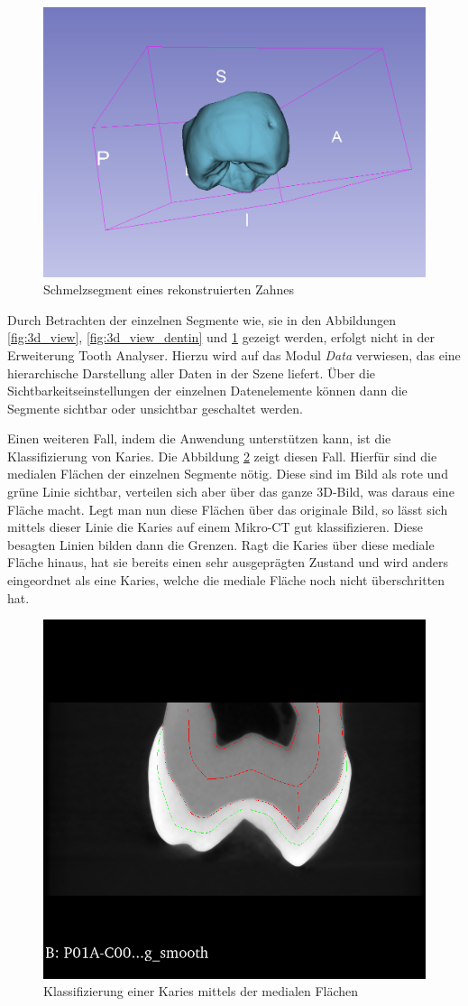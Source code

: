 \begin{figure}[h]
\begin{minipage}[b]{0.32\textwidth}
		\includegraphics[width=\textwidth]{img/3dViewEnamel.png}
		\caption{Schmelzsegment eines rekonstruierten Zahnes}
		\label{fig:3d_view_schmelz}
	\end{minipage}
\end{figure}

Durch Betrachten der einzelnen Segmente wie, sie in den Abbildungen
\ref{fig:3d_view}, \ref{fig:3d_view_dentin} und \ref{fig:3d_view_schmelz} gezeigt
werden, erfolgt nicht in der Erweiterung Tooth Analyser. Hierzu wird auf das Modul
\textit{Data} verwiesen, das eine hierarchische Darstellung aller Daten in der Szene
liefert. Über die Sichtbarkeitseinstellungen der einzelnen Datenelemente können
dann die Segmente sichtbar oder unsichtbar geschaltet werden.

Einen weiteren Fall, indem die Anwendung unterstützen kann, ist die
Klassifizierung von Karies. Die Abbildung \ref{fig:classification} zeigt diesen Fall.
Hierfür sind die medialen Flächen der einzelnen Segmente nötig. Diese sind im Bild
als rote und grüne Linie sichtbar, verteilen sich aber über das ganze \ac{3D}-Bild,
was daraus eine Fläche macht. Legt man nun diese Flächen über das originale Bild,
so lässt sich mittels dieser Linie die Karies auf einem Mikro-\ac{CT} gut klassifizieren.
Diese besagten Linien bilden dann die Grenzen. Ragt die Karies über diese mediale
Fläche hinaus, hat sie bereits einen sehr ausgeprägten Zustand und wird anders
eingeordnet als eine Karies, welche die mediale Fläche noch nicht überschritten hat.

\begin{figure}[h]
	\centering
	\includegraphics[width=0.3 \textwidth]{img/classification.png}
	\caption{Klassifizierung einer Karies mittels der medialen Flächen}
	\label{fig:classification}
\end{figure}

